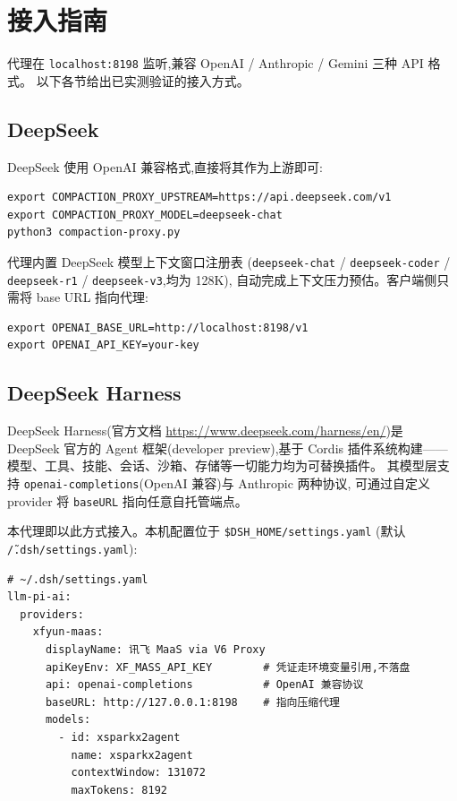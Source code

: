 \documentclass[11pt,a4paper]{article}
\begin{document}
\section{接入指南}

代理在 \texttt{localhost:8198} 监听,兼容 OpenAI / Anthropic / Gemini 三种 API 格式。
以下各节给出已实测验证的接入方式。

\subsection{DeepSeek}

DeepSeek 使用 OpenAI 兼容格式,直接将其作为上游即可:

\begin{lstlisting}
export COMPACTION_PROXY_UPSTREAM=https://api.deepseek.com/v1
export COMPACTION_PROXY_MODEL=deepseek-chat
python3 compaction-proxy.py
\end{lstlisting}

代理内置 DeepSeek 模型上下文窗口注册表
(\texttt{deepseek-chat} / \texttt{deepseek-coder} / \texttt{deepseek-r1} / \texttt{deepseek-v3},均为 128K),
自动完成上下文压力预估。客户端侧只需将 base URL 指向代理:

\begin{lstlisting}
export OPENAI_BASE_URL=http://localhost:8198/v1
export OPENAI_API_KEY=your-key
\end{lstlisting}

\subsection{DeepSeek Harness}

DeepSeek Harness(官方文档 \url{https://www.deepseek.com/harness/en/})是 DeepSeek 官方的
Agent 框架(developer preview),基于 Cordis 插件系统构建——
模型、工具、技能、会话、沙箱、存储等一切能力均为可替换插件。
其模型层支持 \texttt{openai-completions}(OpenAI 兼容)与 Anthropic 两种协议,
可通过自定义 provider 将 \texttt{baseURL} 指向任意自托管端点。

本代理即以此方式接入。本机配置位于 \texttt{\$DSH\_HOME/settings.yaml}
(默认 \texttt{\~/.dsh/settings.yaml}):

\begin{lstlisting}[language={}]
# ~/.dsh/settings.yaml
llm-pi-ai:
  providers:
    xfyun-maas:
      displayName: 讯飞 MaaS via V6 Proxy
      apiKeyEnv: XF_MASS_API_KEY        # 凭证走环境变量引用,不落盘
      api: openai-completions           # OpenAI 兼容协议
      baseURL: http://127.0.0.1:8198    # 指向压缩代理
      models:
        - id: xsparkx2agent
          name: xsparkx2agent
          contextWindow: 131072
          maxTokens: 8192
\end{lstlisting}
\end{document}
